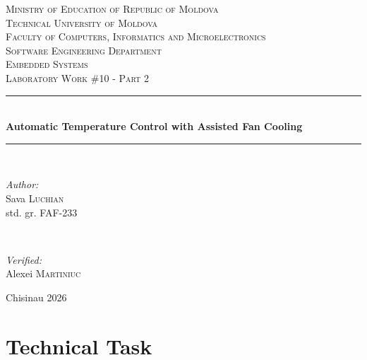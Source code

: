 \documentclass[12pt]{article}
\begin{document}
\begin{titlepage}
  \begin{center}
    \textsc{\large Ministry of Education of Republic of Moldova}\\[0.5cm]
    \textsc{\large Technical University of Moldova}\\[0.5cm]
    \textsc{\large Faculty of Computers, Informatics and Microelectronics}\\[0.5cm]
    \textsc{\large Software Engineering Department}\\[1.2cm]

    \vspace{20mm}
    \textsc{\Large Embedded Systems}\\[0.5cm]
    \textsc{\large Laboratory Work \#10 - Part 2}\\[0.5cm]

    \newcommand{\HRule}{\rule{\linewidth}{0.5mm}}
    \vspace{8mm}
    \HRule\\[0.4cm]
    {\LARGE \bfseries Automatic Temperature Control with Assisted Fan Cooling\\[0.3cm]}
    \HRule\\[1.5cm]

    \begin{minipage}[t]{0.45\textwidth}
      \begin{flushleft}\large
        \emph{Author:}\\
        Sava \textsc{Luchian}\\
        std. gr. FAF-233
      \end{flushleft}
    \end{minipage}
    ~
    \begin{minipage}[t]{0.45\textwidth}
      \begin{flushright}\large
        \emph{Verified:}\\
        Alexei \textsc{Martiniuc}
      \end{flushright}
    \end{minipage}

    \vspace*{\fill}
    \large Chisinau 2026
  \end{center}
\end{titlepage}

\setcounter{page}{2}
\pagestyle{fancy}
\fancyhf{}
\rhead{\thepage}

\section*{Technical Task}
\end{document}
